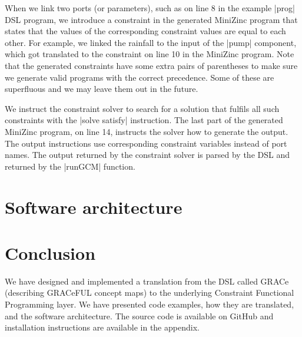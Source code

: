 \documentclass{article}
\begin{document}
When we link two ports (or parameters), such as on line 8 in the
example |prog| DSL program, we introduce a constraint in the generated
MiniZinc program that states that the values of the corresponding
constraint values are equal to each other.
%
For example, we linked the rainfall to the input of the |pump|
component, which got translated to the constraint on line 10 in the
MiniZinc program.
%
Note that the generated constraints have some extra pairs of
parentheses to make sure we generate valid programs with the correct
precedence.
%
Some of these are superfluous and we may leave them out in the future.

We instruct the constraint solver to search for a solution that
fulfils all such constraints with the |solve satisfy| instruction.
%
The last part of the generated MiniZinc program, on line 14, instructs
the solver how to generate the output.
%
The output instructions use corresponding constraint variables instead
of port names.
%
The output returned by the constraint solver is parsed by the DSL and
returned by the |runGCM| function.




\section{Software architecture}
\label{sec:architecture}




%
%

\section{Conclusion}
\label{sec:conclusion}

We have designed and implemented a translation from the DSL called
GRACe (describing GRACeFUL concept maps) to the underlying Constraint
Functional Programming layer.
%
We have presented code examples, how they are translated, and the
software architecture.
The source code is available on GitHub and installation instructions
are available in the appendix.
\end{document}
